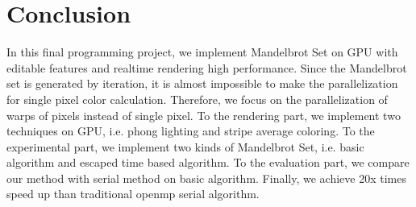 \documentclass{article}
\begin{document}
\begin{center}
\end{center}
\section{Conclusion}
    In this final programming project, we implement Mandelbrot Set on GPU with editable features and realtime rendering high performance. Since the Mandelbrot set is generated by iteration, it is almost impossible to make the parallelization for single pixel color calculation. Therefore, we focus on the parallelization of warps of pixels instead of single pixel. To the rendering part, we implement two techniques on GPU, i.e. phong lighting and stripe average coloring. To the experimental part, we implement two kinds of Mandelbrot Set, i.e. basic algorithm and escaped time based algorithm. To the evaluation part, we compare our method with serial method on basic algorithm. Finally, we achieve 20x times speed up than traditional openmp serial algorithm.





\end{document}
